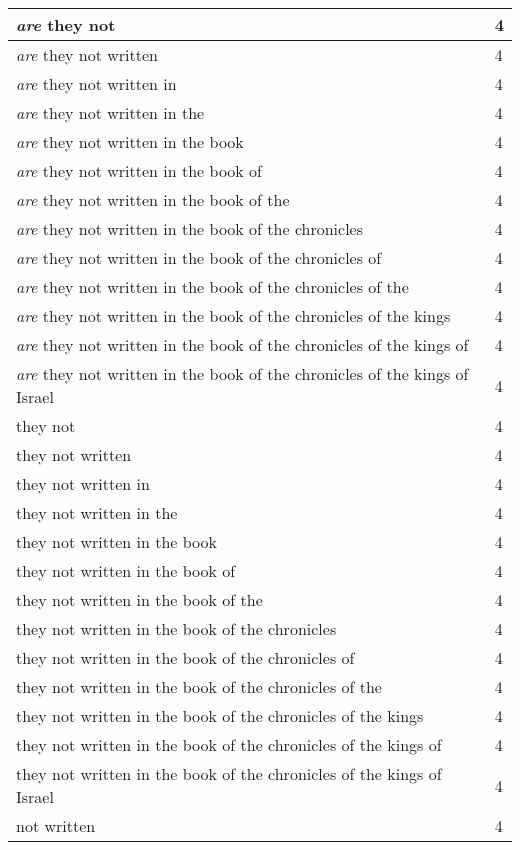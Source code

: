 \begin{center}
\begin{longtable}{|p{3.0in}|p{0.5in}|}
\emph{are} they not & 4\\ \hline 
\emph{are} they not written & 4\\ \hline 
\emph{are} they not written in & 4\\ \hline 
\emph{are} they not written in the & 4\\ \hline 
\emph{are} they not written in the book & 4\\ \hline 
\emph{are} they not written in the book of & 4\\ \hline 
\emph{are} they not written in the book of the & 4\\ \hline 
\emph{are} they not written in the book of the chronicles & 4\\ \hline 
\emph{are} they not written in the book of the chronicles of & 4\\ \hline 
\emph{are} they not written in the book of the chronicles of the & 4\\ \hline 
\emph{are} they not written in the book of the chronicles of the kings & 4\\ \hline 
\emph{are} they not written in the book of the chronicles of the kings of & 4\\ \hline 
\emph{are} they not written in the book of the chronicles of the kings of Israel & 4\\ \hline 
they not & 4\\ \hline 
they not written & 4\\ \hline 
they not written in & 4\\ \hline 
they not written in the & 4\\ \hline 
they not written in the book & 4\\ \hline 
they not written in the book of & 4\\ \hline 
they not written in the book of the & 4\\ \hline 
they not written in the book of the chronicles & 4\\ \hline 
they not written in the book of the chronicles of & 4\\ \hline 
they not written in the book of the chronicles of the & 4\\ \hline 
they not written in the book of the chronicles of the kings & 4\\ \hline 
they not written in the book of the chronicles of the kings of & 4\\ \hline 
they not written in the book of the chronicles of the kings of Israel & 4\\ \hline 
not written & 4\\ \hline 

\end{longtable}
\end{center}
